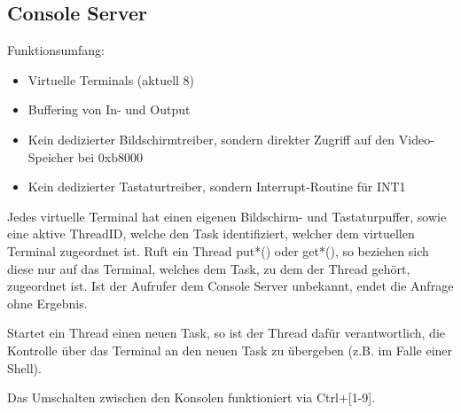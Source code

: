 \subsection{Console Server}



Funktionsumfang:
\begin{itemize}
	\item Virtuelle Terminals (aktuell 8)
	\item Buffering von In- und Output
	\item Kein dedizierter Bildschirmtreiber, sondern direkter Zugriff auf den Video-Speicher bei 0xb8000
	\item Kein dedizierter Tastaturtreiber, sondern Interrupt-Routine für INT1
\end{itemize}

Jedes virtuelle Terminal hat einen eigenen Bildschirm- und Tastaturpuffer, sowie eine aktive ThreadID, welche den Task identifiziert, welcher dem virtuellen Terminal zugeordnet ist. Ruft ein Thread put*() oder get*(), so beziehen sich diese nur auf das Terminal, welches dem Task, zu dem der Thread gehört, zugeordnet ist. Ist der Aufrufer dem Console Server unbekannt, endet die Anfrage ohne Ergebnis.

Startet ein Thread einen neuen Task, so ist der Thread dafür verantwortlich, die Kontrolle über das Terminal an den neuen Task zu übergeben (z.B. im Falle einer Shell).

Das Umschalten zwischen den Konsolen funktioniert via Ctrl+[1-9].